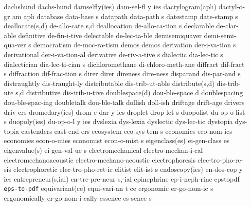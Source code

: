 \1 dachshund		dachs-hund
\3 damselfly(ies)	dam-sel-fl y ies	%
\3 dactylogram(aph)	dactyl-o-gr am aph	%
\5 database		data-base s
\5 datapath		data-path s
\5 datestamp		date-stamp s            %
\2 deallocate(s,d)	de-allo-cate s,d	%
\5 deallocation		de-allo-ca-tion s	%
\1 declarable		de-clar-able
\1 definitive		de-fin-i-tive
\1 delectable		de-lec-ta-ble
\5 demisemiquaver	demi-semi-qua-ver s	%
\1 democratism		de-moc-ra-tism
\1 demos		demos	
\5 derivation		der-i-va-tion s		%
\1 derivational		der-i-va-tion-al	%
\5 derivative		de-riv-a-tive s
\5 dialectic		dia-lec-tic s		%
\5 dialectician		dia-lec-ti-cian s	%
\1 dichloromethane	di-chloro-meth-ane	%
\5 diffract		dif-fract s
\5 diffraction		dif-frac-tion s		%
\1 direr		direr
\1 direness		dire-ness
\5 disparand		dis-par-and s
\1 distraughtly		dis-traught-ly
\1 distributable	dis-trib-ut-able	%
\2 distribute(s,d)	dis-trib-ute s,d
\1 distributive 	dis-trib-u-tive 	%
\2 doublespace(d)	dou-ble-space d
\1 doublespacing	dou-ble-spac-ing
\1 doubletalk		dou-ble-talk		%
\1 dollish		doll-ish
\1 driftage		drift-age
\1 drivers		driv-ers		%
\3 dromedary(ies)	drom-e-dar y ies
\5 droplet		drop-let s		%
\5 duopolist		du-op-o-list s
\3 duopoly(ies)		du-op-o-l y ies
\1 dyslexia		dys-lexia		%
\1 dyslectic		dys-lec-tic		%
\1 dystopia		dys-topia		%
\1 eastenders		east-end-ers
\5 ecosystem		eco-sys-tem s		%
\1 economics		eco-nom-ics
\1 economies		econ-o-mies		%
\5 economist		econ-o-mist s
\2 eigenclass(es)	ei-gen-class es		%
\2 eigenvalue(s)	ei-gen-val-ue s		%
\1 electromechanical	electro-mechan-i-cal
\1 electromechanoacoustic  electro-mechano-acoustic
\1 electrophoresis	elec-tro-pho-re-sis	%
\1 electrophoretic	elec-tro-pho-ret-ic	%
\5 elitist		elit-ist s
\3 endoscopy(ies)	en-dos-cop y ies	%
\2 entrepreneur(s,ial)	en-tre-pre-neur s,-ial
\1 epinephrine		ep-i-neph-rine
\1 epstopdf		{\tt eps-to-pdf}	%
\3 equivariant(ce)	equi-vari-an t ce
\5 ergonomic		er-go-nom-ic s		%
\1 ergonomically	er-go-nom-i-cally	%
\5 essence		es-sence s		%
